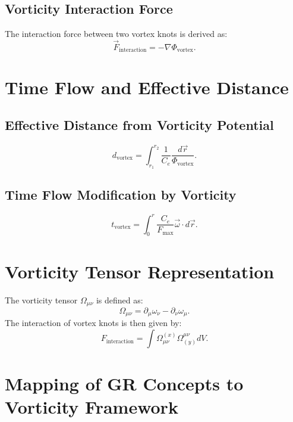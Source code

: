     \subsection{Vorticity Interaction Force}
    The interaction force between two vortex knots is derived as:
    \begin{equation}
        \vec{F}_{\text{interaction}} = -\nabla \Phi_{\text{vortex}}.
    \end{equation}

    \section{Time Flow and Effective Distance}

    \subsection{Effective Distance from Vorticity Potential}
    \begin{equation}
        d_{\text{vortex}} = \int_{r_1}^{r_2} \frac{1}{C_e} \frac{d\vec{r}}{\Phi_{\text{vortex}}}.
    \end{equation}

    \subsection{Time Flow Modification by Vorticity}
    \begin{equation}
        t_{\text{vortex}} = \int_0^r \frac{C_e}{F_{\text{max}}} \vec{\omega} \cdot d\vec{r}.
    \end{equation}

    \section{Vorticity Tensor Representation}
    The vorticity tensor $\Omega_{\mu \nu}$ is defined as:
    \begin{equation}
        \Omega_{\mu \nu} = \partial_\mu \omega_\nu - \partial_\nu \omega_\mu.
    \end{equation}
    The interaction of vortex knots is then given by:
    \begin{equation}
        F_{\text{interaction}} = \int \Omega_{\mu \nu}^{(x)} \Omega^{\mu \nu}_{(y)} dV.
    \end{equation}

    \section{Mapping of GR Concepts to Vorticity Framework}

